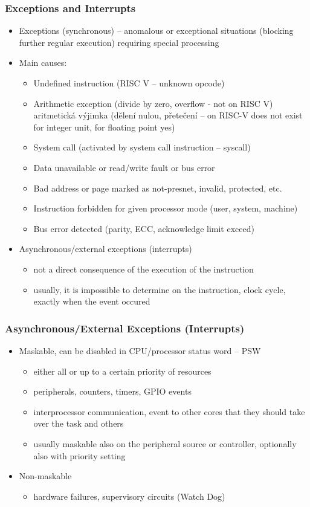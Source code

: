 \documentclass{beamer}
\begin{document}
\begin{frame}
\frametitle{Exceptions and Interrupts}

\begin{itemize}
 \item Exceptions (synchronous) -- anomalous or exceptional situations (blocking
further regular execution) requiring special processing
 \item Main causes:
 \begin{itemize}
  \item Undefined instruction (RISC V -- unknown opcode)
  \item Arithmetic exception (divide by zero, overflow - not on RISC V)
aritmetická výjimka (dělení nulou, přetečení -- on RISC-V does not exist for integer unit, for floating point yes)
  \item System call (activated by system call instruction -- syscall)
  \item Data unavailable or read/write fault or bus error
  \item Bad address or page marked as not-presnet, invalid, protected, etc.
  \item Instruction forbidden for given processor mode (user, system, machine)
  \item Bus error detected (parity, ECC, acknowledge limit exceed)
 \end{itemize}
 \item Asynchronous/external exceptions (interrupts)
 \begin{itemize}
  \item not a direct consequence of the execution of the instruction
  \item usually, it is impossible to determine on the instruction, clock cycle, exactly when the event occured
 \end{itemize}
\end{itemize}
\end{frame}

\begin{frame}
\frametitle{Asynchronous/External Exceptions (Interrupts)}

\begin{itemize}
 \item Maskable, can be disabled in CPU/processor status word -- PSW
 \begin{itemize}
   \item either all or up to a certain priority of resources
   \item peripherals, counters, timers, GPIO events
   \item interprocessor communication, event to other cores that they should take over the task and others
   \item usually maskable also on the peripheral source or controller, optionally also with priority setting
 \end{itemize}
 \item Non-maskable
 \begin{itemize}
  \item hardware failures, supervisory circuits (Watch Dog)
 \end{itemize}
\end{itemize}
\end{frame}
\end{document}
